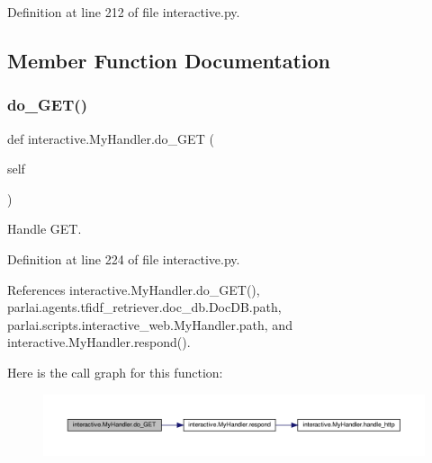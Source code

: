 Definition at line 212 of file interactive.\+py.



\subsection{Member Function Documentation}
\mbox{\label{classinteractive_1_1MyHandler_a718f9206286bfce516ecbc3cd33bb960}} 
\subsubsection{\texorpdfstring{do\+\_\+\+G\+E\+T()}{do\_GET()}\hspace{0.1cm}{\footnotesize\ttfamily [1/2]}}
{\footnotesize\ttfamily def interactive.\+My\+Handler.\+do\+\_\+\+G\+ET (\begin{DoxyParamCaption}\item[{}]{self }\end{DoxyParamCaption})}

\begin{DoxyVerb}Handle GET.\end{DoxyVerb}
 

Definition at line 224 of file interactive.\+py.



References interactive.\+My\+Handler.\+do\+\_\+\+G\+E\+T(), parlai.\+agents.\+tfidf\+\_\+retriever.\+doc\+\_\+db.\+Doc\+D\+B.\+path, parlai.\+scripts.\+interactive\+\_\+web.\+My\+Handler.\+path, and interactive.\+My\+Handler.\+respond().

Here is the call graph for this function\+:
\nopagebreak
\begin{figure}[H]
\begin{center}
\leavevmode
\includegraphics[width=350pt]{classinteractive_1_1MyHandler_a718f9206286bfce516ecbc3cd33bb960_cgraph}
\end{center}
\end{figure}
\mbox{\label{classinteractive_1_1MyHandler_a718f9206286bfce516ecbc3cd33bb960}} 
